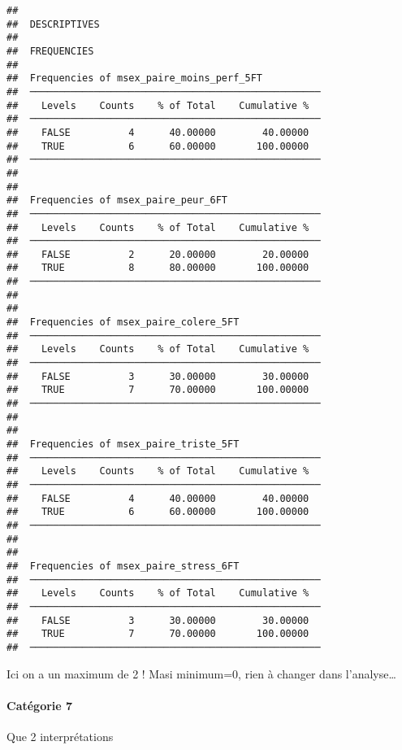 \documentclass[
]{article}
\begin{document}
\begin{verbatim}
## 
##  DESCRIPTIVES
## 
##  FREQUENCIES
## 
##  Frequencies of msex_paire_moins_perf_5FT           
##  ────────────────────────────────────────────────── 
##    Levels    Counts    % of Total    Cumulative %   
##  ────────────────────────────────────────────────── 
##    FALSE          4      40.00000        40.00000   
##    TRUE           6      60.00000       100.00000   
##  ────────────────────────────────────────────────── 
## 
## 
##  Frequencies of msex_paire_peur_6FT                 
##  ────────────────────────────────────────────────── 
##    Levels    Counts    % of Total    Cumulative %   
##  ────────────────────────────────────────────────── 
##    FALSE          2      20.00000        20.00000   
##    TRUE           8      80.00000       100.00000   
##  ────────────────────────────────────────────────── 
## 
## 
##  Frequencies of msex_paire_colere_5FT               
##  ────────────────────────────────────────────────── 
##    Levels    Counts    % of Total    Cumulative %   
##  ────────────────────────────────────────────────── 
##    FALSE          3      30.00000        30.00000   
##    TRUE           7      70.00000       100.00000   
##  ────────────────────────────────────────────────── 
## 
## 
##  Frequencies of msex_paire_triste_5FT               
##  ────────────────────────────────────────────────── 
##    Levels    Counts    % of Total    Cumulative %   
##  ────────────────────────────────────────────────── 
##    FALSE          4      40.00000        40.00000   
##    TRUE           6      60.00000       100.00000   
##  ────────────────────────────────────────────────── 
## 
## 
##  Frequencies of msex_paire_stress_6FT               
##  ────────────────────────────────────────────────── 
##    Levels    Counts    % of Total    Cumulative %   
##  ────────────────────────────────────────────────── 
##    FALSE          3      30.00000        30.00000   
##    TRUE           7      70.00000       100.00000   
##  ──────────────────────────────────────────────────
\end{verbatim}

Ici on a un maximum de 2 ! Masi minimum=0, rien à changer dans
l'analyse\ldots{}

\hypertarget{catuxe9gorie-7}{%
\paragraph{Catégorie 7}\label{catuxe9gorie-7}}

Que 2 interprétations
\end{document}
